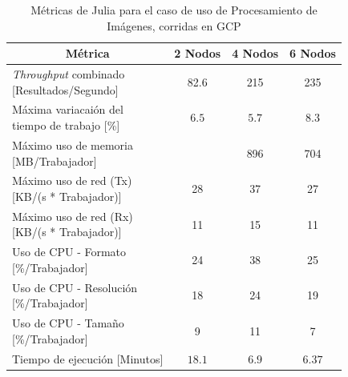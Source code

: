 \documentclass[11pt]{article}
\providecommand{\row}[1]{\parbox{150pt}{\setlength{\baselineskip}{0.2\baselineskip}\strut#1\strut}}
\newcommand{\ipcap}[2]{\caption{Métricas de #1 para el caso de uso de Procesamiento de Imágenes, corridas en #2}}
\newcommand{\english}[1]{\textit{#1}}
\begin{document}
\begin{table}[H]
\centering
\begin{tabular}{|l|c|c|c|}
\hline
\multicolumn{1}{|c|}{Métrica} & 2 Nodos & 4 Nodos & 6 Nodos \\ \hline
\row{\english{Throughput} combinado\\{[Resultados/Segundo]}} & 82.6 & 215 & 235 \\ \hline
\row{Máxima variacaión del \\ tiempo de trabajo {[}\%{]}} & $6.5$ & $5.7$ & $8.3$ \\ \hline
\row{Máximo uso de memoria \\ {[MB/Trabajador]}} &  & 896 & 704 \\ \hline
\row{Máximo uso de red (Tx) \\ {[KB/(s * Trabajador)]}} & 28 & 37 & 27 \\ \hline
\row{Máximo uso de red (Rx) \\ {[KB/(s * Trabajador)]}} & 11 & 15 & 11 \\ \hline
\row{Uso de CPU - Formato\\{[\%/Trabajador]}} & 24 & 38 & 25 \\ \hline
\row{Uso de CPU - Resolución\\{[\%/Trabajador]}} & 18 & 24 & 19 \\ \hline
\row{Uso de CPU - Tamaño\\{[\%/Trabajador]}} & 9 & 11 & 7 \\ \hline
Tiempo de ejecución [Minutos] & $18.1$ & $6.9$ & $6.37$ \\ \hline
\end{tabular}
\ipcap{Julia}{GCP}
\end{table}
\end{document}
